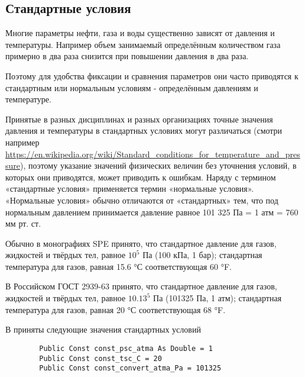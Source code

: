 \subsection{Стандартные условия} 
Многие параметры нефти, газа и воды существенно зависят от давления и температуры. Например объем занимаемый определённым количеством газа примерно в два раза снизится при повышении давления в два раза. 

Поэтому для удобства фиксации и сравнения параметров они часто приводятся к стандартным или нормальным условиям - определённым давлениям и температуре. 
	
	Принятые в разных дисциплинах и разных организациях точные значения давления и температуры в стандартных условиях могут различаться (смотри например \url{https://en.wikipedia.org/wiki/Standard_conditions_for_temperature_and_pressure}), поэтому указание значений физических величин без уточнения условий, в которых они приводятся, может приводить к ошибкам. Наряду с термином «стандартные условия» применяется термин «нормальные условия». «Нормальные условия» обычно отличаются от «стандартных» тем, что под нормальным давлением принимается давление равное 101 325 Па = 1 атм = 760 мм рт. ст.
	
	Обычно в монографиях SPE принято, что стандартное давление для газов, жидкостей и твёрдых тел, равное $10^5$ Па (100 кПа, 1 бар); стандартная температура для газов, равная 15.6 °С соответствующая 60 °F. 
	
	В Российском ГОСТ 2939-63  принято, что стандартное давление для газов, жидкостей и твёрдых тел, равное $10.13^5$ Па (101325 Па, 1 атм); стандартная температура для газов, равная 20 °С соответствующая 68 °F. 
	
	В \unf{} приняты следующие значения стандартных условий
	
	
	\begin{listing}[H]
		\begin{verbatim}
		Public Const const_psc_atma As Double = 1
		Public Const const_tsc_C = 20
		Public Const const_convert_atma_Pa = 101325
		\end{verbatim}
	\end{listing}

